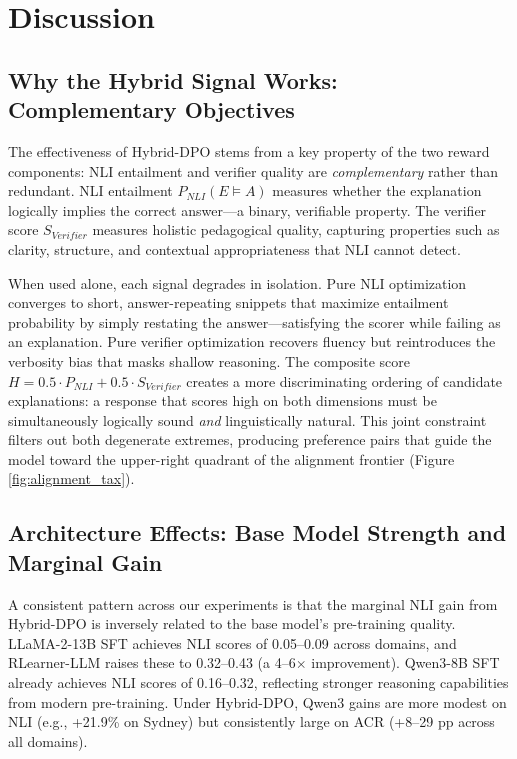 \section{Discussion}

\subsection{Why the Hybrid Signal Works: Complementary Objectives}

The effectiveness of Hybrid-DPO stems from a key property of the two reward components: NLI entailment and verifier quality are \textit{complementary} rather than redundant. NLI entailment $P_{NLI}(E \models A)$ measures whether the explanation logically implies the correct answer---a binary, verifiable property. The verifier score $S_{Verifier}$ measures holistic pedagogical quality, capturing properties such as clarity, structure, and contextual appropriateness that NLI cannot detect.

When used alone, each signal degrades in isolation. Pure NLI optimization converges to short, answer-repeating snippets that maximize entailment probability by simply restating the answer---satisfying the scorer while failing as an explanation. Pure verifier optimization recovers fluency but reintroduces the verbosity bias that masks shallow reasoning. The composite score $H = 0.5 \cdot P_{NLI} + 0.5 \cdot S_{Verifier}$ creates a more discriminating ordering of candidate explanations: a response that scores high on both dimensions must be simultaneously logically sound \textit{and} linguistically natural. This joint constraint filters out both degenerate extremes, producing preference pairs that guide the model toward the upper-right quadrant of the alignment frontier (Figure \ref{fig:alignment_tax}).

\subsection{Architecture Effects: Base Model Strength and Marginal Gain}

A consistent pattern across our experiments is that the marginal NLI gain from Hybrid-DPO is inversely related to the base model's pre-training quality. LLaMA-2-13B SFT achieves NLI scores of 0.05--0.09 across domains, and RLearner-LLM raises these to 0.32--0.43 (a 4--6$\times$ improvement). Qwen3-8B SFT already achieves NLI scores of 0.16--0.32, reflecting stronger reasoning capabilities from modern pre-training. Under Hybrid-DPO, Qwen3 gains are more modest on NLI (e.g., +21.9\% on Sydney) but consistently large on ACR (+8--29 pp across all domains).

